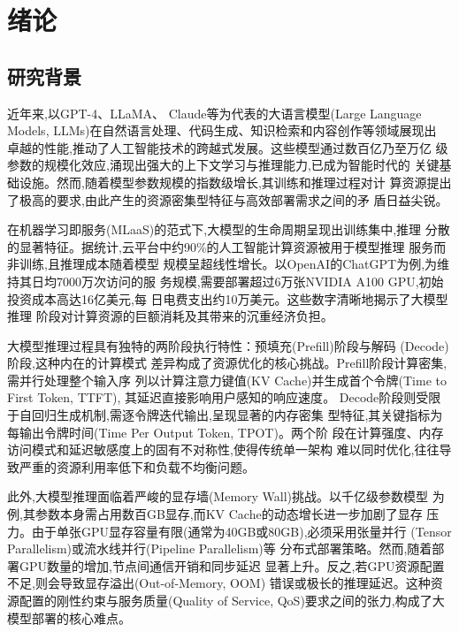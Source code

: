 
\chapter{绪论}
\section{研究背景}

近年来,以GPT-4\cite{achiam2023gpt4}、LLaMA\cite{touvron2023llama}、
Claude\cite{anthropic2025claude}等为代表的大语言模型(Large Language
Models, LLMs)在自然语言处理、代码生成、知识检索和内容创作等领域展现出
卓越的性能,推动了人工智能技术的跨越式发展。这些模型通过数百亿乃至万亿
级参数的规模化效应,涌现出强大的上下文学习与推理能力,已成为智能时代的
关键基础设施。然而,随着模型参数规模的指数级增长,其训练和推理过程对计
算资源提出了极高的要求,由此产生的资源密集型特征与高效部署需求之间的矛
盾日益尖锐\cite{zhang2023llm_survey,li2022cloud_resource}。

在机器学习即服务(MLaaS)的范式下,大模型的生命周期呈现出训练集中,推理
分散的显著特征。据统计,云平台中约90\%的人工智能计算资源被用于模型推理
服务而非训练\cite{wu2022sustainable,wang2023kv_cache},且推理成本随着模型
规模呈超线性增长。以OpenAI的ChatGPT为例,为维持其日均7000万次访问的服
务规模,需要部署超过6万张NVIDIA A100 GPU,初始投资成本高达16亿美元,每
日电费支出约10万美元\cite{he2024uellm}。这些数字清晰地揭示了大模型推理
阶段对计算资源的巨额消耗及其带来的沉重经济负担。

大模型推理过程具有独特的两阶段执行特性：预填充(Prefill)阶段与解码
(Decode)阶段\cite{transformers},这种内在的计算模式
差异构成了资源优化的核心挑战。Prefill阶段计算密集,需并行处理整个输入序
列以计算注意力键值(KV Cache)并生成首个令牌(Time to First Token, TTFT),
其延迟直接影响用户感知的响应速度\cite{feng2025windserve,zhao2022gpu_sched}。
Decode阶段则受限于自回归生成机制,需逐令牌迭代输出,呈现显著的内存密集
型特征,其关键指标为每输出令牌时间(Time Per Output Token, TPOT)。两个阶
段在计算强度、内存访问模式和延迟敏感度上的固有不对称性,使得传统单一架构
难以同时优化,往往导致严重的资源利用率低下和负载不均衡问题\cite{zhou2024survey}。

此外,大模型推理面临着严峻的显存墙(Memory Wall)挑战。以千亿级参数模型
为例,其参数本身需占用数百GB显存,而KV Cache的动态增长进一步加剧了显存
压力。由于单张GPU显存容量有限(通常为40GB或80GB),必须采用张量并行
(Tensor Parallelism)\cite{tensorrtllm}或流水线并行(Pipeline Parallelism)等
分布式部署策略。然而,随着部署GPU数量的增加,节点间通信开销和同步延迟
显著上升。反之,若GPU资源配置不足,则会导致显存溢出(Out-of-Memory, OOM)
错误或极长的推理延迟。这种资源配置的刚性约束与服务质量(Quality of
Service, QoS)要求之间的张力,构成了大模型部署的核心难点。

